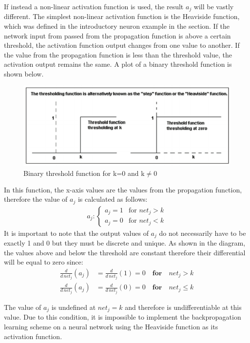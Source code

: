 If instead a non-linear activation function is used, the result $a_j$ will be vastly different. The simplest non-linear activation function is the Heaviside function, which was defined in the introductory neuron example in the section. If the network input from passed from the propagation function is above a certain threshold, the activation function output changes from one value to another. If the value from the propagation function is less than the threshold value, the activation output remains the same. A plot of a binary threshold function is shown below.
\newpage
\begin{figure}[h]
	\centering
	\includegraphics[scale=0.6]{9}
	\caption{Binary threshold function for k=0 and k$\neq$0}
\end{figure}

In this function, the x-axis values are the values from the propagation function, therefore the value of $a_j$ is calculated as follows:
\begin{gather*}
a_j :
\begin{cases}
	a_j = 1 & \text{for }net_j>k\\    
	a_j = 0 &  \text{for } net_j < k    
\end{cases}
\end{gather*}
It is important to note that the output values of $a_j$ do not necessarily have to be exactly 1 and 0 but they must be discrete and unique. As shown in the diagram, the values above and below the threshold are constant therefore their differential will be equal to zero since:
\begin{align}
		\frac{d}{d\,net_j} (a_j )&=\frac{d}{d\,net_j} (1)=  0 \quad \textbf{for} \quad net_j >k \\
		\frac{d}{d\,net_j} (a_j )&=\frac{d}{d\,net_j} (0)=  0 \quad \textbf{for} \quad net_j \leq k
\end{align}

The value of $a_j$ is undefined at $net_j=k$ and therefore is undifferentiable at this value. Due to this condition, it is impossible to implement the backpropagation learning scheme on a neural network using the Heaviside function as its activation function.

